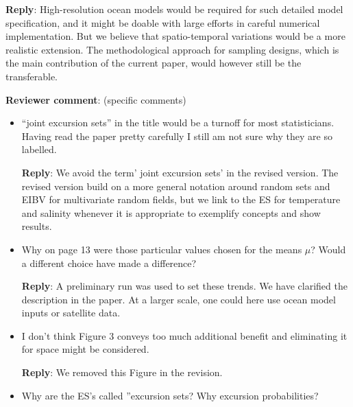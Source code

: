 \documentclass[a4paper]{article}
\def\revcom{\textbf{Reviewer comment}}
\def\reply{\textbf{Reply}}
\begin{document}
\begin{answers}
\reply: High-resolution ocean models would be required for such detailed model specification, and it might be doable with large efforts in careful numerical implementation. But we believe that spatio-temporal variations would be a more realistic extension. The methodological approach for sampling designs, which is the main contribution of the current paper, would however still be the transferable.  

\item{\revcom : (specific comments)}\label{q11}


\begin{itemize}[noitemsep,topsep=0pt,parsep=0pt,partopsep=0pt]

\item “joint excursion sets” in the title would be a turnoff for most statisticians. Having read the paper pretty carefully I still am not sure why they are so labelled.\par
\reply: We avoid the term' joint excursion sets' in the revised version. The revised version build on a more general notation around random sets and EIBV for multivariate random fields, but we link to the ES for temperature and salinity whenever it is appropriate to exemplify concepts and show results.

\vspace{1em}

\item Why on page 13 were those particular values chosen for the means $\mu$? Would a different choice have made a difference?\par

\reply: A preliminary run was used to set these trends. We have clarified the description in the paper. At a larger scale, one could here use ocean model inputs or satellite data. 

\vspace{1em}

\item I don’t think Figure 3 conveys too much additional benefit and eliminating it for space might be considered.\par

\reply: We removed this Figure in the revision. 

\vspace{1em}

\item Why are the ES’s called ”excursion sets? Why excursion probabilities?\par


\end{itemize}
\end{answers}
\end{document}
